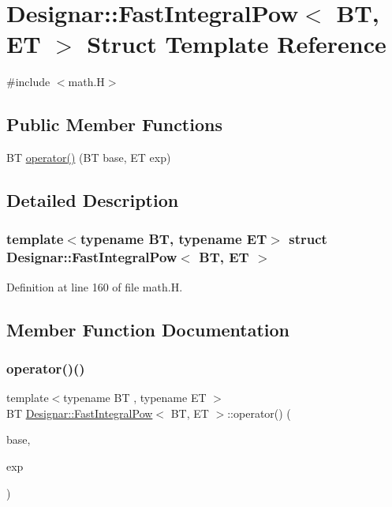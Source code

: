 \hypertarget{struct_designar_1_1_fast_integral_pow}{}\section{Designar\+:\+:Fast\+Integral\+Pow$<$ BT, ET $>$ Struct Template Reference}
\label{struct_designar_1_1_fast_integral_pow}


{\ttfamily \#include $<$math.\+H$>$}

\subsection*{Public Member Functions}
\begin{DoxyCompactItemize}
\item 
BT \hyperlink{struct_designar_1_1_fast_integral_pow_a0c78ecac21d1454b9bdae4620c3473db}{operator()} (BT base, ET exp)
\end{DoxyCompactItemize}


\subsection{Detailed Description}
\subsubsection*{template$<$typename BT, typename ET$>$\newline
struct Designar\+::\+Fast\+Integral\+Pow$<$ B\+T, E\+T $>$}



Definition at line 160 of file math.\+H.



\subsection{Member Function Documentation}
\mbox{\label{struct_designar_1_1_fast_integral_pow_a0c78ecac21d1454b9bdae4620c3473db}} 
\subsubsection{\texorpdfstring{operator()()}{operator()()}}
{\footnotesize\ttfamily template$<$typename BT , typename ET $>$ \\
BT \hyperlink{struct_designar_1_1_fast_integral_pow}{Designar\+::\+Fast\+Integral\+Pow}$<$ BT, ET $>$\+::operator() (\begin{DoxyParamCaption}\item[{BT}]{base,  }\item[{ET}]{exp }\end{DoxyParamCaption})\hspace{0.3cm}{\ttfamily [inline]}}



